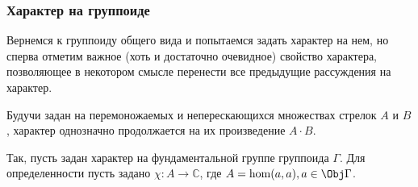 \subsubsection{Характер на группоиде}
    Вернемся к группоиду общего вида и попытаемся задать характер на нем, но 
    сперва отметим важное (хоть и достаточно очевидное) свойство характера, позволяющее в 
    некотором смысле перенести все предыдущие рассуждения на характер.

    \begin{statement}
        Будучи задан на перемоножаемых и неперескающихся множествах стрелок $A$ 
        и $B$, характер однозначно продолжается на их произведение $A\cdot B$.
    \end{statement}

        Так, пусть задан характер на фундаментальной группе группоида $\Gamma$. 
    Для определенности пусть задано $\chi : A \to \mathbb{C}$, 
    где $A = \hom(a,a), a \in \Obj \Gamma$.


    
